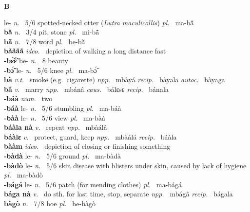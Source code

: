 \medskip
\noindent \large {\bfseries B}\normalsize\\
\medskip

 le- {\itshape n.~} 5/6 spotted-necked otter ({\itshape Lutra maculicollis}) {\itshape pl.~} ma-bã̂    \\ 
{\bfseries  bã̂}  {\itshape n.~} 3/4 pit, stone {\itshape pl.~} mi-bã̂    \\ 
{\bfseries  bã̌}  {\itshape n.~} 7/8 word {\itshape pl.~} be-bã̌    \\ 
{\bfseries bã́ã́ã́ã́}  {\itshape ideo.~} depiction of walking a long distance fast    \\ 
{\bfseries -bɛ̃́ɛ̃̀} be- {\itshape n.~} 8 beauty    \\ 
{\bfseries -bɔ̃́} le- {\itshape n.~} 5/6 knee {\itshape pl.~} ma-bɔ̃́   \\ 
{\bfseries bà}  {\itshape v.t.~} smoke (e.g.\ cigarette)   {\itshape npp.~} mbàyá {\itshape recip.~} bàyala {\itshape autoc.~} bàyaga \\ 
{\bfseries bâ}  {\itshape v.~} marry   {\itshape npp.~} mbánâ {\itshape caus.~} bálɛsɛ {\itshape recip.~} bánala  \\ 
{\bfseries -báà}  {\itshape num.~} two    \\ 
{\bfseries -báà} le- {\itshape n.~} 5/6 stumbling {\itshape pl.~} ma-báà    \\ 
{\bfseries -bàà} le- {\itshape n.~} 5/6 view {\itshape pl.~} ma-bàà    \\ 
{\bfseries báàla nà}  {\itshape v.~} repeat   {\itshape npp.~} mbàálâ  \\ 
{\bfseries báàlɛ}  {\itshape v.~} protect, guard, keep   {\itshape npp.~} mbàálá {\itshape recip.~} báàla  \\ 
{\bfseries bààm}  {\itshape ideo.~} depiction of closing or finishing something    \\ 
{\bfseries -bàdà} le- {\itshape n.~} 5/6 ground {\itshape pl.~} ma-bàdà    \\ 
{\bfseries -bàdò} le- {\itshape n.~} 5/6 skin disease with blisters under skin, caused by lack of hygiene {\itshape pl.~} ma-bàdò    \\ 
{\bfseries -bágá} le- {\itshape n.~} 5/6 patch (for mending clothes) {\itshape pl.~} ma-bágá    \\ 
{\bfseries bága nà}  {\itshape v.~} do sth. for last time, stop, separate   {\itshape npp.~} mbágâ {\itshape recip.~} bágala  \\ 
{\bfseries bàgò}  {\itshape n.~} 7/8 hoe {\itshape pl.~} be-bàgò    \\ 
